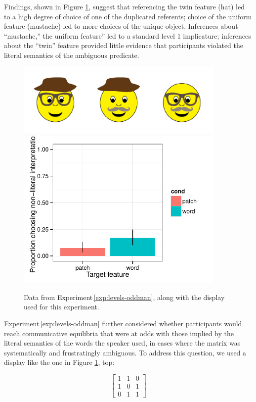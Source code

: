 \documentclass[man,noapacite]{apa2}
\newcounter{Experiment}
\newcommand{\exptref}[1]{Experiment\,\ref{#1}}
\begin{document}
Findings, shown in Figure \ref{fig:levels-oddman}, suggest that referencing the twin feature ({\sc hat}) led to a high degree of choice of one of the duplicated referents; choice of the uniform feature ({\sc mustache}) led to more choices of the unique object. Inferences about ``mustache,'' the uniform feature'' led to a standard level 1 implicature; inferences about the ``twin'' feature provided little evidence that participants violated the literal semantics of the ambiguous predicate.

 \begin{figure}[t]
  \centering
  \includegraphics[width=4in]{figures/levels-oddman-stim.pdf}
  \includegraphics[width=4in]{../plots/3-levels-oddman.pdf}

  \caption{\label{fig:levels-oddman} Data from \exptref{exp:levels-oddman}, along with the display used for this experiment.}
\end{figure}

\exptref{exp:levels-oddman} further considered whether participants would reach communicative equilibria that were at odds with those implied by the literal semantics of the words the speaker used, in cases where the matrix was systematically and frustratingly ambiguous. To address this question, we used a display like the one in Figure \ref{fig:levels-oddman}, top:

\begin{equation}
\left[
    \begin{array}{ccc}
      1 & 1 & 0 \\
      1 & 0 & 1\\
      0 & 1 & 1
    \end{array}
  \right]
\end{equation}
\end{document}
